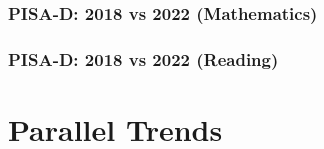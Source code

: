 \documentclass{beamer}
\begin{document}
\begin{frame}
    \label{update_scott}
    \frametitle{PISA-D: 2018 vs 2022 (Mathematics)}
        {
    }
\end{frame}

\begin{frame}
    \label{update_scott}
    \frametitle{PISA-D: 2018 vs 2022 (Reading)}
        {
    }
\end{frame}




\section{Parallel Trends}
\end{document}
